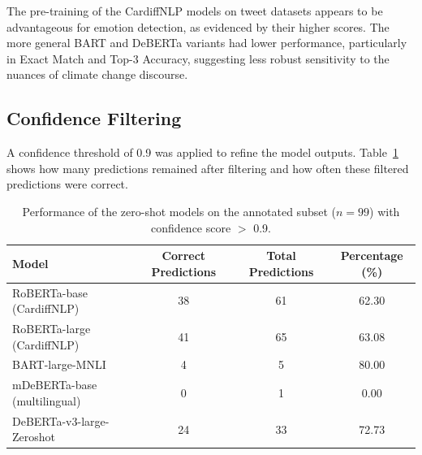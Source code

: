 \begin{table}[htbp]
    \centering
    \caption{Performance of the zero-shot models on the annotated subset ($n=99$).}
    \label{tab:model-results}
\end{table}

The pre-training of the CardiffNLP models on tweet datasets appears to be advantageous for emotion detection, as evidenced by their higher scores. The more general BART and DeBERTa variants had lower performance, particularly in Exact Match and Top-3 Accuracy, suggesting less robust sensitivity to the nuances of climate change discourse.

\subsection{Confidence Filtering}

A confidence threshold of 0.9 was applied to refine the model outputs. Table~\ref{tab:confidence-filtering} shows how many predictions remained after filtering and how often these filtered predictions were correct.

\begin{table}[htbp]
    \centering
    \small
    \begin{tabular}{@{}lccc@{}}
        \toprule
        \textbf{Model} & \textbf{Correct Predictions} & \textbf{Total Predictions} & \textbf{Percentage (\%)} \\
        \midrule
        RoBERTa-base (CardiffNLP) & 38 & 61 & 62.30 \\
        RoBERTa-large (CardiffNLP) & 41 & 65 & 63.08 \\
        BART-large-MNLI & 4 & 5 & 80.00 \\
        mDeBERTa-base (multilingual) & 0 & 1 & 0.00 \\
        DeBERTa-v3-large-Zeroshot & 24 & 33 & 72.73 \\
        \bottomrule
    \end{tabular}
    \caption{Performance of the zero-shot models on the annotated subset ($n=99$) with confidence score $>$ 0.9.}
    \label{tab:confidence-filtering}
\end{table}

